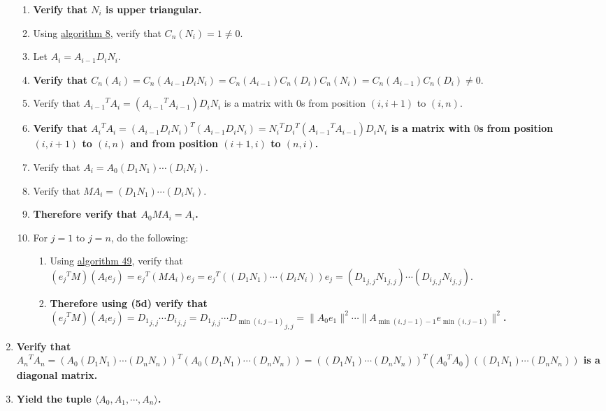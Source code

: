 \documentclass[twocolumn]{article}
\begin{document}
\begin{enumerate}
\begin{enumerate}
					\item \textbf{Verify that $N_i$ is upper triangular.}
					\item Using \hyperref[sec:algorithm 8]{algorithm 8}, verify that $C_n(N_i)=1\ne 0$.
					\item Let $A_i=A_{i-1}D_iN_i$.
					\item \textbf{Verify that $C_n(A_i)=C_n(A_{i-1}D_iN_i)=C_n(A_{i-1})C_n(D_i)C_n(N_i)=C_n(A_{i-1})C_n(D_i)\ne 0$}.
					\item Verify that ${A_{i-1}}^TA_i=({A_{i-1}}^TA_{i-1})D_iN_i$ is a matrix with $0$s from position $(i,i+1)$ to $(i,n)$.
					\item \textbf{Verify that ${A_i}^TA_i=(A_{i-1}D_iN_i)^T(A_{i-1}D_iN_i)={N_i}^T{D_i}^T({A_{i-1}}^TA_{i-1})D_iN_i$ is a matrix with $0$s from position $(i,i+1)$ to $(i,n)$ and from position $(i+1,i)$ to $(n,i)$.}
					\item Verify that $A_i=A_0(D_1N_1)\cdots (D_iN_i)$.
					\item Verify that $MA_i=(D_1N_1)\cdots (D_iN_i)$.
					\item \textbf{Therefore verify that $A_0MA_i=A_i$.}
					\item For $j=1$ to $j=n$, do the following:
					\begin{enumerate}
						\item Using \hyperref[sec:algorithm 49]{algorithm 49}, verify that $({e_j}^TM)(A_ie_j)={e_j}^T(MA_i)e_j={e_j}^T((D_1N_1)\cdots (D_iN_i))e_j=({D_1}_{j,j}{N_1}_{j,j})\cdots ({D_i}_{j,j}{N_i}_{j,j})$.
						\item \textbf{Therefore using (5d) verify that $({e_j}^TM)(A_ie_j)={D_1}_{j,j}\cdots {D_i}_{j,j}={D_1}_{j,j}\cdots {D_{\min(i,j-1)}}_{j,j}=\lVert A_0e_1\rVert^2\cdots\lVert A_{\min(i,j-1)-1}e_{\min(i,j-1)}\rVert^2$.}
					\end{enumerate}
				\end{enumerate}
				\item \textbf{Verify that ${A_n}^TA_n=(A_0(D_1N_1)\cdots (D_nN_n))^T(A_0(D_1N_1)\cdots (D_nN_n))=((D_1N_1)\cdots (D_nN_n))^T({A_0}^TA_0)((D_1N_1)\cdots (D_nN_n))$ is a diagonal matrix.}
				\item \textbf{Yield the tuple $\langle A_0,A_1,\cdots,A_n\rangle$.}
			\end{enumerate}
\end{document}
